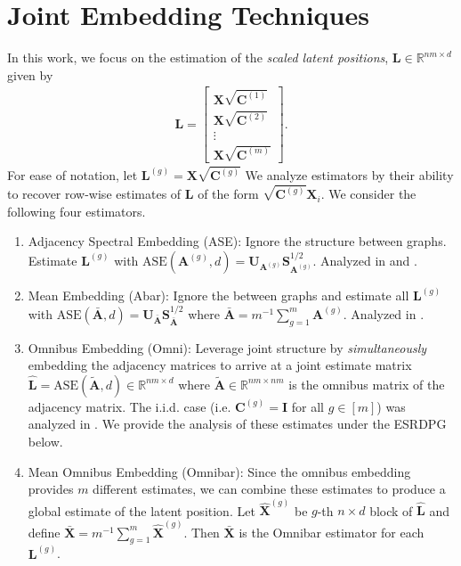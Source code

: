 \documentclass{article}
\newcommand{\R}{{\mathbb{R}}}
\newcommand{\bvar}[1]{\mathbf{#1}}
\theoremstyle{definition}
\numberwithin{Def}{section}
\begin{document}
\section{Joint Embedding Techniques}

In this work, we focus on the estimation of the \textit{scaled latent positions}, $\bvar{L} \in\R^{nm\times d}$ given by 
\begin{align*}
    \bvar{L} = \begin{bmatrix}
    \bvar{X}\sqrt{\bvar{C}^{(1)}}\\
    \bvar{X}\sqrt{\bvar{C}^{(2)}}\\
    \vdots \\
    \bvar{X}\sqrt{\bvar{C}^{(m)}}
    \end{bmatrix}.
\end{align*}
For ease of notation, let $\bvar{L}^{(g)} = \bvar{X}\sqrt{\bvar{C}^{(g)}}$
We analyze estimators by their ability to recover row-wise estimates of $\bvar{L}$ of the form $\sqrt{\bvar{C}^{(g)}}\bvar{X}_i$. 
We consider the following four estimators. 
\begin{enumerate}
    \item Adjacency Spectral Embedding (ASE): Ignore the  structure between graphs. 
    Estimate $\bvar{L}^{(g)}$ with $\text{ASE}(\bvar{A}^{(g)}, d) = \bvar{U}_{\bvar{A}^{(g)}}\bvar{S}^{1/2}_{\bvar{A}^{(g)}}$. 
    Analyzed in \textcite{ASE} and \textcite{EigenCLT}. 
    \item Mean Embedding (Abar): Ignore the  between graphs and estimate all $\bvar{L}^{(g)}$ with $\text{ASE}(\bar{\bvar{A}}, d) = \bvar{U}_{\bar{\bvar{A}}}\bvar{S}^{1/2}_{\bar{\bvar{A}}}$ where $\bar{\bvar{A}} = m^{-1}\sum_{g=1}^m\bvar{A}^{(g)}$. 
    Analyzed in \textcite{Connectome-Smooth}. 
    \item Omnibus Embedding (Omni): Leverage joint structure by \textit{simultaneously} embedding the adjacency matrices to arrive at a joint estimate matrix $\hat{\bvar{L}} = \text{ASE}(\tilde{\bvar{A}}, d)\in\R^{nm\times d}$ where $\tilde{\bvar{A}}\in\R^{nm\times nm}$ is the omnibus matrix of the adjacency matrix.   
    The i.i.d. case (i.e. $\bvar{C}^{(g)} = \bvar{I}$ for all $g\in[m]$) was analyzed in \textcite{OmniCLT}.
    We provide the analysis of these estimates under the ESRDPG below.  
    \item Mean Omnibus Embedding (Omnibar): Since the omnibus embedding provides $m$ different estimates, we can combine these estimates to produce a global estimate of the latent position. 
    Let $\hat{\bvar{X}}^{(g)}$ be $g$-th $n\times d$ block of $\hat{\bvar{L}}$ and define $\bar{\bvar{X}} = m^{-1}\sum_{g=1}^m \hat{\bvar{X}}^{(g)}$. 
    Then $\bar{\bvar{X}}$ is the Omnibar estimator for each $\bvar{L}^{(g)}$. 
\end{enumerate}
\end{document}
